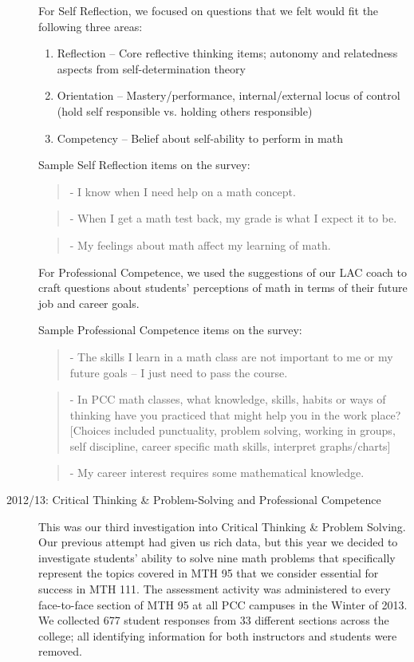 \begin{description}
For Self Reflection, we focused on questions that we felt would fit the
following three areas:
\begin{enumerate}
\item Reflection -- Core reflective thinking items; autonomy and relatedness
  aspects from self-determination theory
\item Orientation -- Mastery/performance, internal/external locus of control
  (hold self responsible vs. holding others responsible)
\item Competency -- Belief about self-ability to perform in math
\end{enumerate}
Sample Self Reflection items on the survey:
\begin{quote}
- I know when I need help on a math concept.
\end{quote}
\begin{quote}
- When I get a math test back, my grade is what I expect it to be.
\end{quote}
\begin{quote}
- My feelings about math affect my learning of math.
\end{quote}

For Professional Competence, we used the suggestions of our LAC coach to craft
questions about students' perceptions of math in terms of their future
job and career goals. 

Sample Professional Competence items on the survey:
\begin{quote}
- The skills I learn in a math class are not important to me or my future goals --
I just need to pass the course.
\end{quote}
\begin{quote}
- In PCC math classes, what knowledge, skills, habits or ways of thinking have you
practiced that might help you in the work place? [Choices included punctuality,
problem solving, working in groups, self discipline, career specific math
skills, interpret graphs/charts]
\end{quote}
\begin{quote}
- My career interest requires some mathematical knowledge.
\end{quote}

\item[2012/13:  Critical Thinking \& Problem-Solving and Professional Competence]

This was our third investigation into Critical Thinking \& Problem Solving.  Our previous attempt had given
us rich data, but this year we decided to investigate students' ability to solve
nine math problems that specifically represent the topics covered in MTH 95 that
we consider essential for success in MTH 111.  The assessment activity was
administered to every face-to-face section of MTH 95 at all PCC campuses in the
Winter of 2013.  We collected 677 student responses from 33 different sections
across the college; all identifying information for both instructors and
students were removed.


\end{description}
